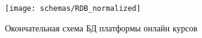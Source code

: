 \documentclass[a4paper,14pt]{article}
\begin{document}


\begin{figure}[H]
	\centering		
	\texttt{[image: schemas/RDB\_normalized]}
	\caption{Окончательная схема БД платформы онлайн курсов}\label{img:RDB_normalized}
\end{figure}

%	
\end{document}
